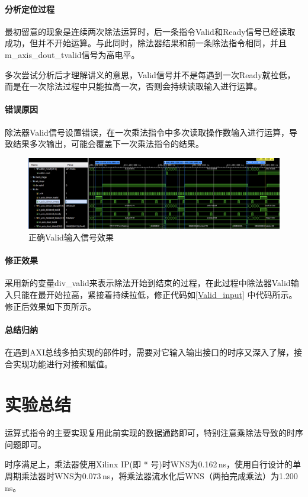 \documentclass[UTF-8,twoside,c5size]{ctexart}
\begin{document}
	
	\paragraph{分析定位过程}\hfill
	
	最初留意的现象是连续两次除法运算时，后一条指令Valid和Ready信号已经读取成功，但并不开始运算。与此同时，除法器结果和前一条除法指令相同，并且m\_axis\_dout\_tvalid信号为高电平。
	
	多次尝试分析后才理解讲义的意思，Valid信号并不是每遇到一次Ready就拉低，而是在一次除法过程中只能拉高一次，否则会持续读取输入进行运算。
	
	\paragraph{错误原因}\hfill
	
	除法器Valid信号设置错误，在一次乘法指令中多次读取操作数输入进行运算，导致结果多次输出，可能会覆盖下一次乘法指令的结果。
	
	\begin{figure}[h]
		\centering
		\includegraphics[width=1\linewidth]{valid_correct.png}
		\caption[Valid\_correct]{正确Valid输入信号效果}
		\label{fig:validcorrect}
	\end{figure}

	\paragraph{修正效果}\hfill
	
	采用新的变量div\_valid来表示除法开始到结束的过程，在此过程中除法器Valid输入只能在最开始拉高，紧接着持续拉低，修正代码如\ref{Valid_input} 中代码所示。修正后效果如下页所示。
	
	\paragraph{总结归纳}\hfill
	
	在遇到AXI总线多拍实现的部件时，需要对它输入输出接口的时序又深入了解，接合实现功能进行对接和赋值。
	
	\section{实验总结}
	
	运算式指令的主要实现复用此前实现的数据通路即可，特别注意乘除法导致的时序问题即可。
	
	时序满足上，乘法器使用Xilinx IP(即 * 号)时WNS为0.162\,ns，使用自行设计的单周期乘法器时WNS为0.073\,ns，将乘法器流水化后WNS（两拍完成乘法）为1.200\,ns。
	
\end{document}
